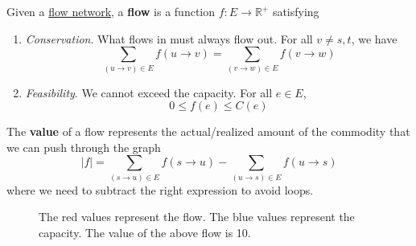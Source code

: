   \begin{definition}[Flow]
    \label{def:flow}
    Given a \hyperref[def:flow-network]{flow network}, a \textbf{flow} is a function $f: E \rightarrow \mathbb{R}^+$ satisfying 
    \begin{enumerate}
      \item \textit{Conservation}. What flows in must always flow out. For all $v \neq s, t$, we have 
        \begin{equation}
          \sum_{(u \rightarrow v) \in E} f(u \rightarrow v) = \sum_{(v \rightarrow w) \in E} f(v \rightarrow w)
        \end{equation}

      \item \textit{Feasibility}. We cannot exceed the capacity. For all $e \in E$, 
        \begin{equation}
          0 \leq f(e) \leq C(e)
        \end{equation}
    \end{enumerate}
    The \textbf{value} of a flow represents the actual/realized amount of the commodity that we can push through the graph
    \begin{equation}
      |f| = \sum_{(s \rightarrow u) \in E}  f(s \rightarrow u) - \sum_{(u \rightarrow s) \in E}  f(u \rightarrow s) 
    \end{equation} 
    where we need to subtract the right expression to avoid loops. 

    \begin{figure}[H]
      \centering
      \caption{The red values represent the flow. The blue values represent the capacity. The value of the above flow is 10.} 
      \label{fig:flow}
    \end{figure}
  \end{definition}


